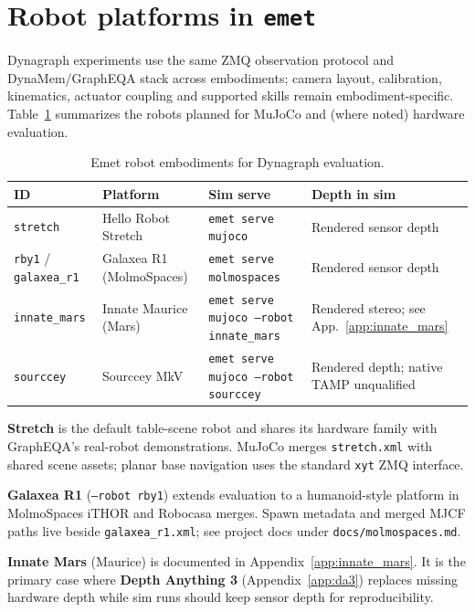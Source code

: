 \section{Robot platforms in \texttt{emet}}
\label{app:robots}

Dynagraph experiments use the same ZMQ observation protocol and DynaMem/GraphEQA stack across embodiments; camera layout, calibration, kinematics, actuator coupling and supported skills remain embodiment-specific.
Table~\ref{tab:robots} summarizes the robots planned for MuJoCo and (where noted) hardware evaluation.

\begin{table}[h]
  \centering
  \caption{Emet robot embodiments for Dynagraph evaluation.}
  \label{tab:robots}
  \small
  \begin{tabular}{@{}p{.14\linewidth}p{.20\linewidth}p{.32\linewidth}p{.25\linewidth}@{}}
    \toprule
    ID & Platform & Sim serve & Depth in sim \\
    \midrule
    \texttt{stretch} & Hello Robot Stretch & \texttt{emet serve mujoco} & Rendered sensor depth \\
    \texttt{rby1} / \texttt{galaxea\_r1} & Galaxea R1 (MolmoSpaces) & \texttt{emet serve molmospaces} & Rendered sensor depth \\
    \texttt{innate\_mars} & Innate Maurice (Mars) & \texttt{emet serve mujoco --robot innate\_mars} & Rendered stereo; see App.~\ref{app:innate_mars} \\
    \texttt{sourccey} & Sourccey MkV & \texttt{emet serve mujoco --robot sourccey} & Rendered depth; native TAMP unqualified \\
    \bottomrule
  \end{tabular}
\end{table}

\textbf{Stretch} is the default table-scene robot and shares its hardware family with GraphEQA's real-robot demonstrations.
MuJoCo merges \texttt{stretch.xml} with shared scene assets; planar base navigation uses the standard \texttt{xyt} ZMQ interface.

\textbf{Galaxea R1} (\texttt{--robot rby1}) extends evaluation to a humanoid-style platform in MolmoSpaces iTHOR and Robocasa merges.
Spawn metadata and merged MJCF paths live beside \texttt{galaxea\_r1.xml}; see project docs under \texttt{docs/molmospaces.md}.

\textbf{Innate Mars} (Maurice) is documented in Appendix~\ref{app:innate_mars}.
It is the primary case where \textbf{Depth Anything 3} (Appendix~\ref{app:da3}) replaces missing hardware depth while sim runs should keep sensor depth for reproducibility.

